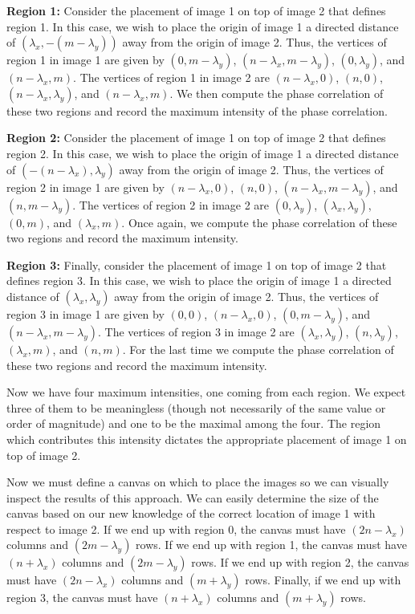 \documentclass[]{article}
\begin{document}
\vskip 5pt

\textbf{Region 1:} Consider the placement of image 1 on top of image 2 that defines region 1. In this case, we wish to place the origin of image 1 a directed distance of $(\lambda_x,-{(m-\lambda_y)})$ away from the origin of image 2. Thus, the vertices of region 1 in image 1 are given by $(0,m-\lambda_y)$, $(n-\lambda_x,m-\lambda_y)$, $(0,\lambda_y)$, and $(n-\lambda_x,m)$. The vertices of region 1 in image 2 are $(n-\lambda_x,0)$, $(n,0)$, $(n-\lambda_x, \lambda_y)$, and $(n-\lambda_x,m)$. We then compute the phase correlation of these two regions and record the maximum intensity of the phase correlation.

\vskip 5pt

\textbf{Region 2:} Consider the placement of image 1 on top of image 2 that defines region 2. In this case, we wish to place the origin of image 1 a directed distance of $(-(n-\lambda_x),\lambda_y)$ away from the origin of image 2. Thus, the vertices of region 2 in image 1 are given by $(n-\lambda_x,0)$, $(n,0)$, $(n-\lambda_x,m-\lambda_y)$, and $(n,m-\lambda_y)$. The vertices of region 2 in image 2 are $(0,\lambda_y)$, $(\lambda_x,\lambda_y)$, $(0,m)$, and $(\lambda_x,m)$. Once again, we compute the phase correlation of these two regions and record the maximum intensity.

\vskip 5pt

\textbf{Region 3:} Finally, consider the placement of image 1 on top of image 2 that defines region 3. In this case, we wish to place the origin of image 1 a directed distance of $(\lambda_x,\lambda_y)$ away from the origin of image 2. Thus, the vertices of region 3 in image 1 are given by $(0,0)$, $(n-\lambda_x,0)$, $(0,m-\lambda_y)$, and $(n-\lambda_x,m-\lambda_y)$. The vertices of region 3 in image 2 are $(\lambda_x,\lambda_y)$, $(n,\lambda_y)$, $(\lambda_x,m)$, and $(n,m)$. For the last time we compute the phase correlation of these two regions and record the maximum intensity.

Now we have four maximum intensities, one coming from each region. We expect three of them to be meaningless (though not necessarily of the same value or order of magnitude) and one to be the maximal among the four. The region which contributes this intensity dictates the appropriate placement of image 1 on top of image 2. 

Now we must define a canvas on which to place the images so we can visually inspect the results of this approach. We can easily determine the size of the canvas based on our new knowledge of the correct location of image 1 with respect to image 2. If we end up with region 0, the canvas must have $(2n-\lambda_x)$ columns and $(2m-\lambda_y)$ rows. If we end up with region 1, the canvas must have $(n+\lambda_x)$ columns and $(2m-\lambda_y)$ rows. If we end up with region 2, the canvas must have $(2n-\lambda_x)$ columns and $(m+\lambda_y)$ rows. Finally, if we end up with region 3, the canvas must have $(n+\lambda_x)$ columns and $(m+\lambda_y)$ rows. 
\end{document}
